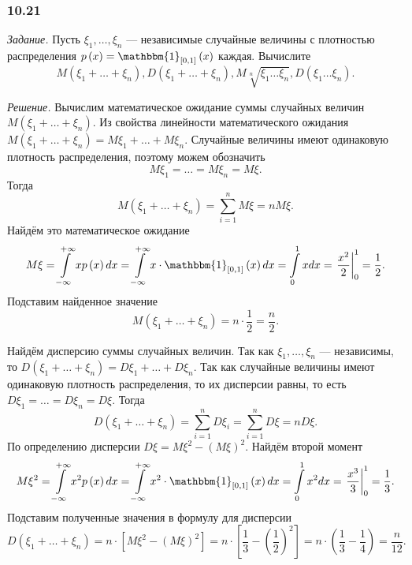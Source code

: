 \subsubsection*{10.21}

\textit{Задание.}
Пусть $ \xi_1, \dotsc, \xi_n$ ---
независимые случайные величины с плотностью распределения $p \left( x \right) = \mathbbm{1}_{ \left[ 0, 1 \right] } \left( x \right) $ каждая.
Вычислите
$$M \left( \xi_1 + \dotsc + \xi_n \right),
D \left( \xi_1 + \dotsc + \xi_n \right),
M \sqrt[n]{\xi_1 \dotsc \xi_n},
D \left( \xi_1 \dotsc \xi_n \right).$$

\textit{Решение.} Вычислим математическое ожидание суммы случайных величин $M \left( \xi_1 + \dotsc + \xi_n \right) $.
Из свойства линейности математического ожидания $M \left( \xi_1 + \dotsc + \xi_n \right) = M \xi_1 + \dotsc + M \xi_n$.
Случайные величины имеют одинаковую плотность распределения, поэтому можем обозначить
$$M \xi_1 =
\dotsc =
M \xi_n =
M \xi.$$
Тогда
$$M \left( \xi_1 + \dotsc + \xi_n \right) =
\sum \limits_{i=1}^n M \xi =
nM \xi.$$
Найдём это математическое ожидание
$$M \xi =
\int \limits_{- \infty }^{+ \infty } xp \left( x \right) dx =
\int \limits_{- \infty }^{+ \infty } x \cdot \mathbbm{1}_{ \left[ 0, 1 \right] } \left( x \right) dx =
\int \limits_0^1 xdx =
\left. \frac{x^2}{2} \right|_0^1 =
\frac{1}{2}.$$
Подставим найденное значение
$$M \left( \xi_1 + \dotsc + \xi_n \right) =
n \cdot \frac{1}{2} =
\frac{n}{2}.$$

Найдём дисперсию суммы случайных величин.
Так как $ \xi_1, \dotsc, \xi_n$ --- независимы, то $D \left( \xi_1 + \dotsc + \xi_n \right) = D \xi_1 + \dotsc + D \xi_n$.
Так как случайные величины имеют одинаковую плотность распределения, то их дисперсии равны, то есть $D \xi_1 = \dotsc = D \xi_n = D \xi $.
Тогда
$$D \left( \xi_1 + \dotsc + \xi_n \right) =
\sum \limits_{i=1}^n D \xi_i =
\sum \limits_{i=1}^n D \xi =
nD \xi.$$
По определению дисперсии $D \xi = M \xi^2 - \left( M \xi \right)^2$.
Найдём второй момент
$$M \xi^2 =
\int \limits_{- \infty }^{+ \infty } x^2 p \left( x \right) dx =
\int \limits_{- \infty }^{+ \infty } x^2 \cdot \mathbbm{1}_{ \left[ 0, 1 \right] } \left( x \right) dx =
\int \limits_0^1 x^2 dx =
\left. \frac{x^3}{3} \right|_0^1 =
\frac{1}{3}.$$
Подставим полученные значения в формулу для дисперсии
$$D \left( \xi_1 + \dotsc + \xi_n \right) =
n \cdot \left[ M \xi^2 - \left( M \xi \right)^2 \right] =
n \cdot \left[ \frac{1}{3} - \left( \frac{1}{2} \right)^2 \right] =
n \cdot \left( \frac{1}{3} - \frac{1}{4} \right) =
\frac{n}{12}.$$

